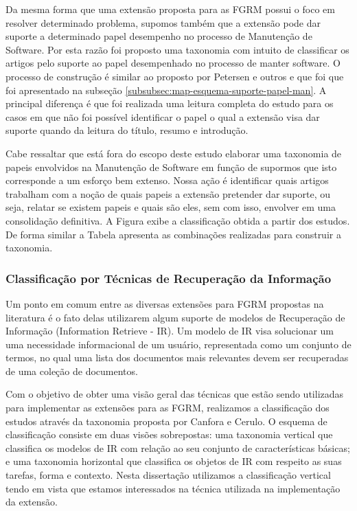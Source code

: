 \documentclass[msc]{ppgccufmg} %
\begin{document}
Da mesma forma que uma extensão proposta para as FGRM possui o foco em resolver determinado
problema, supomos também que a extensão pode dar suporte a determinado papel desempenho no processo
de Manutenção de Software. Por esta razão foi proposto uma taxonomia com intuito de classificar
os artigos pelo suporte ao papel desempenhado no processo de manter software. O processo de
construção é similar ao proposto por Petersen e outros e que foi que foi apresentado na
subseção \ref{subsubsec:map-esquema-suporte-papel-man}. A principal diferença é que foi realizada
uma leitura completa do estudo para os casos em que não foi possível identificar o papel o
qual a extensão visa dar suporte quando da leitura do título, resumo e introdução.

Cabe ressaltar que está fora do escopo deste estudo elaborar uma taxonomia de papeis envolvidos na
Manutenção de Software em função de supormos que isto corresponde a um esforço bem extenso. Nossa
ação é identificar quais artigos trabalham com a noção de quais papeis a extensão pretender dar
suporte,  ou seja,  relatar se existem papeis e quais são eles,  sem com isso, envolver em uma
consolidação definitiva. A Figura exibe a classificação obtida a partir dos estudos. De forma
similar a Tabela apresenta as combinações realizadas para construir a taxonomia. 


\subsubsection{Classificação por Técnicas de Recuperação da Informação}
\label{subsubsec:map-esaquema-tecnicas-ir}

Um ponto em comum entre as diversas extensões para FGRM propostas na literatura é o fato delas utilizarem algum suporte de modelos de Recuperação de Informação (Information Retrieve - IR). Um modelo de IR visa solucionar um uma necessidade informacional de um usuário, representada como um conjunto de termos, no qual uma lista dos documentos mais relevantes devem ser recuperadas de uma coleção de documentos\cite{baeza1999modern}. 

Com o objetivo de obter uma visão geral das técnicas que estão sendo utilizadas para implementar as
extensões para as FGRM, realizamos a classificação dos estudos através da taxonomia proposta por
Canfora e Cerulo\cite{cerulo2004taxonomy}. O esquema de classificação consiste em duas visões
sobrepostas: uma taxonomia vertical que classifica os modelos de IR com relação ao seu conjunto
de características básicas; e uma taxonomia horizontal que classifica os objetos de IR com respeito
as suas tarefas, forma e contexto\cite{cerulo2004taxonomy}. Nesta dissertação utilizamos a
classificação vertical tendo em vista que estamos interessados na técnica utilizada na implementação da extensão.
\end{document}
